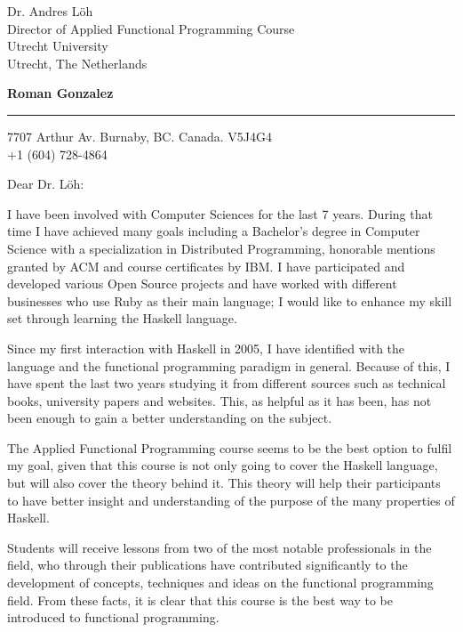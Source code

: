 \documentclass{letter} %
\begin{document}
\signature{Roman Gonzalez.}           %
\longindentation=0pt                  %
\let\raggedleft\raggedright           %
 
 
\begin{letter}{Dr. Andres L\"oh \\
Director of Applied Functional Programming Course \\
Utrecht University \\
Utrecht, The Netherlands}


\begin{flushleft}
{\large\bf Roman Gonzalez}
\end{flushleft}
\medskip\hrule height 1pt
\begin{flushright}
\hfill 7707 Arthur Av. Burnaby, BC. Canada. V5J4G4 \\
\hfill +1 (604) 728-4864
\end{flushright} 
\vfill %

 
\opening{Dear Dr. L\"oh:} 
 
\noindent I have been involved with Computer Sciences for the last 7 years. 
During that time I have achieved many goals including a Bachelor's degree in 
Computer Science with a specialization in Distributed Programming, honorable 
mentions granted by ACM and course certificates by IBM. I have participated and developed various Open 
Source projects and have worked with different businesses who use Ruby as their 
main language; I would like to enhance my skill set through learning the Haskell language.

\noindent Since my first interaction with Haskell in 2005, I have identified with the 
language and the functional programming paradigm in general. Because of this, I have spent the last two years
studying it from different sources such as technical books, university papers and websites. 
This, as helpful as it has been, has not been enough to gain a better understanding on the subject.

\noindent The Applied Functional Programming course seems to be the best option to fulfil my goal, given that this 
course is not only going to cover the Haskell language, but will also cover the theory behind it. This theory will help their participants to have better insight and understanding of the purpose of the many properties of Haskell. 

\noindent Students will receive lessons from two of the most notable professionals in the field, who through 
their publications have contributed significantly to the development of concepts, techniques and ideas on the functional
programming field. From these facts, it is clear that this course is the best way to be introduced to functional programming.


\end{letter}
\end{document}
